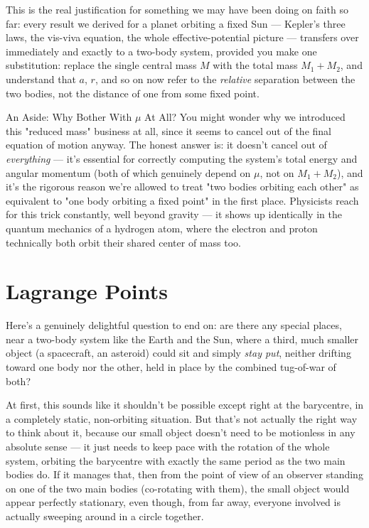\documentclass[11pt]{article}
\begin{document}
This is the real justification for something we may have been doing on faith so far: every result
we derived for a planet orbiting a fixed Sun --- Kepler's three laws, the vis-viva equation, the
whole effective-potential picture --- transfers over immediately and exactly to a two-body system,
provided you make one substitution: replace the single central mass $M$ with the total mass
$M_1+M_2$, and understand that $a$, $r$, and so on now refer to the \emph{relative} separation
between the two bodies, not the distance of one from some fixed point.

\begin{aside}{An Aside: Why Bother With $\mu$ At All?}
You might wonder why we introduced this "reduced mass" business at all, since it seems to cancel
out of the final equation of motion anyway. The honest answer is: it doesn't cancel out of
\emph{everything} --- it's essential for correctly computing the system's total energy and angular
momentum (both of which genuinely depend on $\mu$, not on $M_1+M_2$), and it's the rigorous reason
we're allowed to treat "two bodies orbiting each other" as equivalent to "one body orbiting a fixed
point" in the first place. Physicists reach for this trick constantly, well beyond gravity ---
it shows up identically in the quantum mechanics of a hydrogen atom, where the electron and proton
technically both orbit their shared center of mass too.
\end{aside}

\section{Lagrange Points}

Here's a genuinely delightful question to end on: are there any special places, near a two-body
system like the Earth and the Sun, where a third, much smaller object (a spacecraft, an asteroid)
could sit and simply \emph{stay put}, neither drifting toward one body nor the other, held in
place by the combined tug-of-war of both?

At first, this sounds like it shouldn't be possible except right at the barycentre, in a completely
static, non-orbiting situation. But that's not actually the right way to think about it, because
our small object doesn't need to be motionless in any absolute sense --- it just needs to keep pace
with the rotation of the whole system, orbiting the barycentre with exactly the same period as the
two main bodies do. If it manages that, then from the point of view of an observer standing on
one of the two main bodies (co-rotating with them), the small object would appear perfectly
stationary, even though, from far away, everyone involved is actually sweeping around in a circle
together.
\end{document}
